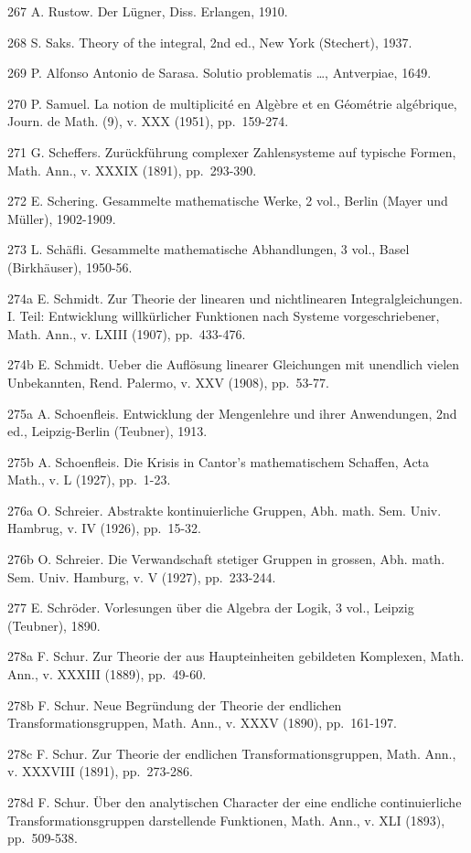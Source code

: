 267 A. Rustow. Der Lügner, Diss. Erlangen, 1910.

268 S. Saks. Theory of the integral, 2nd ed., New York (Stechert), 1937.

269 P. Alfonso Antonio de Sarasa. Solutio problematis \ldots, Antverpiae, 1649.

270 P. Samuel. La notion de multiplicité en Algèbre et en Géométrie algébrique, Journ. de Math. (9), v. XXX (1951), pp.~159-274.

271 G. Scheffers. Zurückführung complexer Zahlensysteme auf typische Formen, Math. Ann., v. XXXIX (1891), pp.~293-390.

272 E. Schering. Gesammelte mathematische Werke, 2 vol., Berlin (Mayer und Müller), 1902-1909.

273 L. Schäfli. Gesammelte mathematische Abhandlungen, 3 vol., Basel (Birkhäuser), 1950-56.

274a E. Schmidt. Zur Theorie der linearen und nichtlinearen Integralgleichungen. I. Teil: Entwicklung willkürlicher Funktionen nach Systeme vorgeschriebener, Math. Ann., v. LXIII (1907), pp.~433-476.

274b E. Schmidt. Ueber die Auflösung linearer Gleichungen mit unendlich vielen Unbekannten, Rend. Palermo, v. XXV (1908), pp.~53-77.

275a A. Schoenfleis. Entwicklung der Mengenlehre und ihrer Anwendungen, 2nd ed., Leipzig-Berlin (Teubner), 1913.

275b A. Schoenfleis. Die Krisis in Cantor's mathematischem Schaffen, Acta Math., v. L (1927), pp.~1-23.

276a O. Schreier. Abstrakte kontinuierliche Gruppen, Abh. math. Sem. Univ. Hambrug, v. IV (1926), pp.~15-32.

276b O. Schreier. Die Verwandschaft stetiger Gruppen in grossen, Abh. math. Sem. Univ. Hamburg, v. V (1927), pp.~233-244.

277 E. Schröder. Vorlesungen über die Algebra der Logik, 3 vol., Leipzig (Teubner), 1890.

278a F. Schur. Zur Theorie der aus Haupteinheiten gebildeten Komplexen, Math. Ann., v. XXXIII (1889), pp.~49-60.

278b F. Schur. Neue Begründung der Theorie der endlichen Transformationsgruppen, Math. Ann., v. XXXV (1890), pp.~161-197.

278c F. Schur. Zur Theorie der endlichen Transformationsgruppen, Math. Ann., v. XXXVIII (1891), pp.~273-286.

278d F. Schur. Über den analytischen Character der eine endliche continuierliche Transformationsgruppen darstellende Funktionen, Math. Ann., v. XLI (1893), pp.~509-538.

